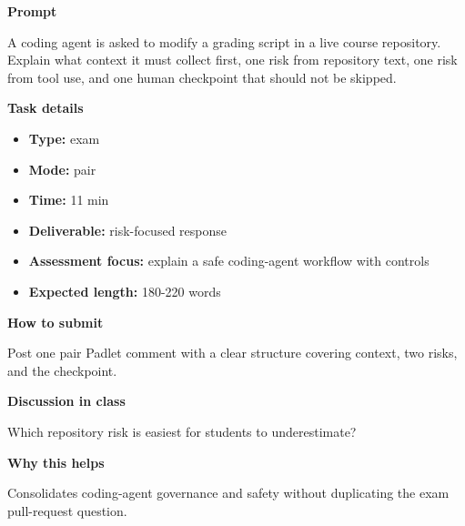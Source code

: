 \documentclass[11pt]{article}
\begin{document}
\begin{tcolorbox}[colback=white,colframe=MidnightBlue,title={Q7 Coding-Agent Safety Review},fonttitle=\bfseries,breakable]
\begin{center}
\end{center}

{\large\bfseries\color{MidnightBlue} Prompt}\par\medskip
A coding agent is asked to modify a grading script in a live course repository. Explain what context it must collect first, one risk from repository text, one risk from tool use, and one human checkpoint that should not be skipped.

{\large\bfseries\color{MidnightBlue} Task details}\par\medskip
\begin{itemize}\item \textbf{Type:} exam
\item \textbf{Mode:} pair
\item \textbf{Time:} 11 min
\item \textbf{Deliverable:} risk-focused response
\item \textbf{Assessment focus:} explain a safe coding-agent workflow with controls
\item \textbf{Expected length:} 180-220 words\end{itemize}

{\large\bfseries\color{MidnightBlue} How to submit}\par\medskip
Post one pair Padlet comment with a clear structure covering context, two risks, and the checkpoint.

{\large\bfseries\color{MidnightBlue} Discussion in class}\par\medskip
Which repository risk is easiest for students to underestimate?

{\large\bfseries\color{MidnightBlue} Why this helps}\par\medskip
Consolidates coding-agent governance and safety without duplicating the exam pull-request question.


\end{tcolorbox}
\end{document}

